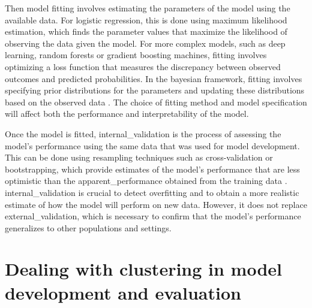 Then model fitting involves estimating the parameters of the model using the available data. For logistic regression, this is done using maximum likelihood estimation, which finds the parameter values that maximize the likelihood of observing the data given the model. For more complex models, such as deep learning, random forests or gradient boosting machines, fitting involves optimizing a loss function that measures the discrepancy between observed outcomes and predicted probabilities. In the bayesian framework, fitting involves specifying prior distributions for the parameters and updating these distributions based on the observed data \cite{vandeschootBayesianStatisticsModelling2021}. The choice of fitting method and model specification will affect both the performance and interpretability of the model.

Once the model is fitted, \gls{internal_validation} is the process of assessing the model's performance using the same data that was used for model development. This can be done using resampling techniques such as cross-validation or bootstrapping, which provide estimates of the model's performance that are less optimistic than the \gls{apparent_performance} obtained from the training data \cite{efthimiou_developing_2024,collinsEvaluationClinicalPrediction2024, dehondPerspectivesValidationClinical2023}. \Gls{internal_validation} is crucial to detect \gls{overfitting} and to obtain a more realistic estimate of how the model will perform on new data. However, it does not replace \gls{external_validation}, which is necessary to confirm that the model's performance generalizes to other populations and settings.

\section[Cluster in model development and evaluation]{Dealing with clustering in model development and evaluation}

